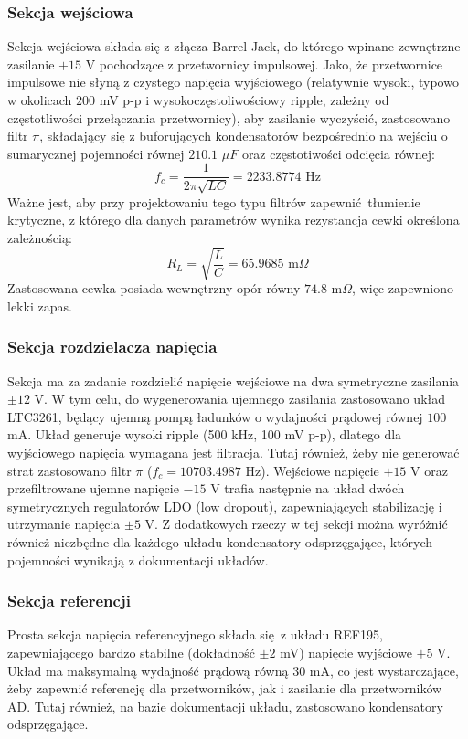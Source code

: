 \documentclass{scrartcl}
\begin{document}
\subsubsection{Sekcja wejściowa}
Sekcja wejściowa składa się z złącza Barrel Jack, do którego wpinane zewnętrzne zasilanie $+15$ V pochodzące z przetwornicy impulsowej. Jako, że przetwornice impulsowe nie słyną z czystego napięcia wyjściowego (relatywnie wysoki, typowo w okolicach $200$ mV p-p i wysokoczęstoliwościowy ripple, zależny od częstotliwości przełączania przetwornicy), aby zasilanie wyczyścić, zastosowano filtr $\pi$, składający się z buforujących kondensatorów bezpośrednio na wejściu o sumarycznej pojemności równej $210.1$ $\mu F$ oraz częstotiwości odcięcia równej:
\begin{equation}
 f_c = \frac{1}{2\pi\sqrt{LC}} = 2233.8774 \text{ Hz}
\end{equation}
Ważne jest, aby przy projektowaniu tego typu filtrów zapewnić tłumienie krytyczne, z którego dla danych parametrów wynika rezystancja cewki określona zależnością:
\begin{equation}
	R_L = \sqrt{\frac{L}{C}} = 65.9685 \text{ m}\Omega
\end{equation}
Zastosowana cewka posiada wewnętrzny opór równy $74.8$ m$\Omega$, więc zapewniono lekki zapas.
\subsubsection{Sekcja rozdzielacza napięcia}
Sekcja ma za zadanie rozdzielić napięcie wejściowe na dwa symetryczne zasilania $\pm12$ V. W tym celu, do wygenerowania ujemnego zasilania zastosowano układ LTC3261, będący ujemną pompą ładunków o wydajności prądowej równej $100$ mA. Układ generuje wysoki ripple (500 kHz, 100 mV p-p), dlatego dla wyjściowego napięcia wymagana jest filtracja. Tutaj również, żeby nie generować strat zastosowano filtr $\pi$ ($f_c = 10703.4987$ Hz). Wejściowe napięcie $+15$ V oraz przefiltrowane ujemne napięcie $-15$ V trafia następnie na układ dwóch symetrycznych regulatorów LDO (low dropout), zapewniających stabilizację i utrzymanie napięcia $\pm5$ V. Z dodatkowych rzeczy w tej sekcji można wyróżnić również niezbędne dla każdego układu kondensatory odsprzęgające, których pojemności wynikają z dokumentacji układów.
\subsubsection{Sekcja referencji}
Prosta sekcja napięcia referencyjnego składa się z układu REF195, zapewniającego bardzo stabilne (dokładność $\pm2$ mV) napięcie wyjściowe $+5$ V. Układ ma maksymalną wydajność prądową równą $30$ mA, co jest wystarczające, żeby zapewnić referencję dla przetworników, jak i zasilanie dla przetworników AD. Tutaj również, na bazie dokumentacji układu, zastosowano kondensatory odsprzęgające.
\end{document}
